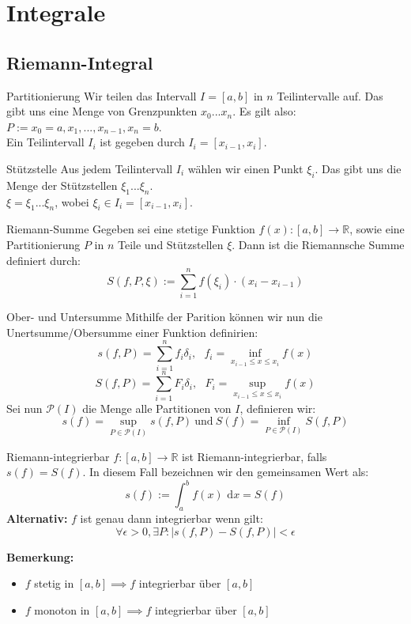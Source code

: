 \documentclass[a4paper,8pt]{extarticle}
\newenvironment{bemerkung}{
   \noindent \textbf{Bemerkung:  }}{}
\def\R{\mathbb{R}}
\def\dx{\text{ d}x}
\begin{document}
\section{Integrale}
\subsection{Riemann-Integral}
\begin{subbox}{Partitionierung}
  Wir teilen das Intervall $I = [a, b]$ in $n$ Teilintervalle auf. Das gibt uns eine Menge von Grenzpunkten $x_0...x_n$. Es gilt also:
  $P := {x_0 = a, x_1, ..., x_{n-1}, x_n = b}$.\\
  Ein Teilintervall $I_i$ ist gegeben durch $I_i =
  [x_{i-1}, x_i]$.
\end{subbox}
\begin{subbox}{Stützstelle}
  Aus jedem Teilintervall $I_i$ wählen wir einen Punkt $\xi_i$. Das gibt uns die Menge der Stützstellen $\xi_1...\xi_n$. \\ $\xi = {\xi_1...\xi_n}$, wobei $\xi_i \in I_i = [x_{i-1}, x_i]$.
\end{subbox}
\begin{mainbox}{Riemann-Summe}
  Gegeben sei eine stetige Funktion $f(x) : [a, b] \rightarrow \R$, sowie eine Partitionierung $P$ in $n$ Teile und Stützstellen $\xi$. Dann ist die Riemannsche Summe definiert durch:
 $$S(f, P, \xi) := \sum_{i=1}^n f(\xi_i) \cdot (x_i - x_{i-1})$$
\end{mainbox}

\begin{subbox}{Ober- und Untersumme}
 Mithilfe der Parition können wir nun die Unertsumme/Obersumme einer Funktion definirien:
 $$s(f, P) = \sum_{i = 1}^n f_i \delta_i, \ \ \ f_i = \inf_{x_{i - 1} \leq x \leq x_i} f(x)$$
 $$S(f, P) = \sum_{i = 1}^n F_i \delta_i, \ \ \ F_i = \sup_{x_{i - 1} \leq x \leq x_i} f(x)$$
 Sei nun $\mathcal{P}(I)$ die Menge alle Partitionen von $I$, definieren wir:
 $$s(f) = \sup_{P \in \mathcal{P}(I)} s(f, P) \ \text{und} \ S(f) = \inf_{P \in \mathcal{P}(I)} S(f, P)$$
\end{subbox}

\begin{mainbox}{Riemann-integrierbar}
 $f:[a,b] \to \R$ ist Riemann-integrierbar, falls $s(f) = S(f)$. In diesem Fall bezeichnen wir den gemeinsamen Wert als: $$s(f) := \int_a^b f(x)\dx = S(f)$$
 \textbf{Alternativ:} $f$ ist genau dann integrierbar wenn gilt: $$\forall \epsilon > 0, \exists P : |s(f, P) - S(f, P)| < \epsilon$$

\end{mainbox}
\begin{bemerkung}
\begin{itemize}
 \item $f$ stetig in $[a,b] \implies f$ integrierbar über $[a,b]$
 \item $f$ monoton in $[a,b] \implies f$ integrierbar über $[a,b]$
\end{itemize}
\end{bemerkung}
\end{document}
